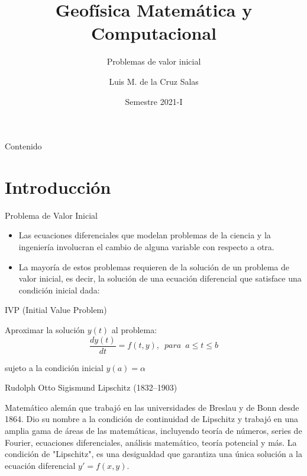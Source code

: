 \documentclass{beamer}
\title[GeoMaC]{Geof\'isica Matem\'atica y Computacional \\
}
\author[\copyright LMCS, IGEF--UNAM]{Luis M. de la Cruz Salas}
\institute[UNAM] 
{ 
{\small{Departamento de Recursos Naturales}} \\
\vspace{0.15cm}
{\small{Instituto de Geof\'isica}} \\ 
\vspace{0.15cm}
{\small{Universidad Nacional Aut\'onoma de M\'exico}} \\
\vspace{0.15cm}
\texttt{[image: unamlogo.png]} 
}
\date{\textcolor{Lured}{\footnotesize{Semestre 2021-I}}}
\subtitle{\textcolor{Lured}{Problemas de valor inicial}}
\begin{document}
	\maketitle

\begin{frame}{Contenido}
	\tableofcontents
\end{frame}	

\section{Introducción}

\begin{frame}{Problema de Valor Inicial}

	\begin{itemize}[<+->]
	\item Las ecuaciones diferenciales que modelan problemas de la ciencia y la ingenier\'ia involucran el cambio de alguna variable con respecto a otra. 
	\item La mayor\'ia de estos problemas requieren de la soluci\'on de un problema de valor inicial, es decir, la soluci\'on de una ecuaci\'on diferencial que satisface una condici\'on inicial dada:
	\end{itemize}

\pause

	\begin{block}{IVP (Initial Value Problem)}
		
	Aproximar la solución $y(t)$ al problema: 
	\begin{displaymath}
	\frac{d y(t)}{d t} = f(t,y), \,\,\, para \,\,\, a \leq t \leq b
	\end{displaymath}

	sujeto a la condición inicial $y(a) = \alpha$
	
	\end{block}		
		
\end{frame}


\begin{frame}{Rudolph Otto Sigismund Lipschitz (1832–1903)}
	
	 Matemático alemán que trabajó en las universidades de Breslau y de Bonn desde 1864. \pause Dio su nombre a la condición de continuidad de Lipschitz y trabajó en una amplia gama de áreas
	de las matemáticas, incluyendo teoría de números, series de Fourier, ecuaciones diferenciales, análisis matemático, teoría potencial y más. \pause 
	La condición de "Lipschitz", es una desigualdad que garantiza una única solución a la ecuación diferencial $y' = f (x, y).$ 
\end{frame}	
\end{document}
